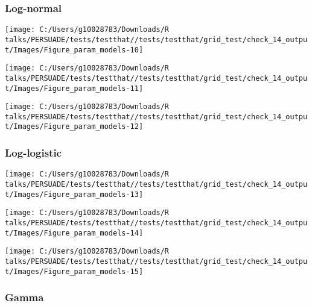 \documentclass[
]{article}
\begin{document}
\subsubsection{Log-normal}\label{log-normal}

\begin{flushleft}\texttt{[image: C:/Users/g10028783/Downloads/R talks/PERSUADE/tests/testthat//tests/testthat/grid\_test/check\_14\_output/Images/Figure\_param\_models-10]} \end{flushleft}

\begin{flushleft}\texttt{[image: C:/Users/g10028783/Downloads/R talks/PERSUADE/tests/testthat//tests/testthat/grid\_test/check\_14\_output/Images/Figure\_param\_models-11]} \end{flushleft}

\begin{flushleft}\texttt{[image: C:/Users/g10028783/Downloads/R talks/PERSUADE/tests/testthat//tests/testthat/grid\_test/check\_14\_output/Images/Figure\_param\_models-12]} \end{flushleft}

\clearpage

\subsubsection{Log-logistic}\label{log-logistic}

\begin{flushleft}\texttt{[image: C:/Users/g10028783/Downloads/R talks/PERSUADE/tests/testthat//tests/testthat/grid\_test/check\_14\_output/Images/Figure\_param\_models-13]} \end{flushleft}

\begin{flushleft}\texttt{[image: C:/Users/g10028783/Downloads/R talks/PERSUADE/tests/testthat//tests/testthat/grid\_test/check\_14\_output/Images/Figure\_param\_models-14]} \end{flushleft}

\begin{flushleft}\texttt{[image: C:/Users/g10028783/Downloads/R talks/PERSUADE/tests/testthat//tests/testthat/grid\_test/check\_14\_output/Images/Figure\_param\_models-15]} \end{flushleft}

\clearpage

\subsubsection{Gamma}\label{gamma}
\end{document}

